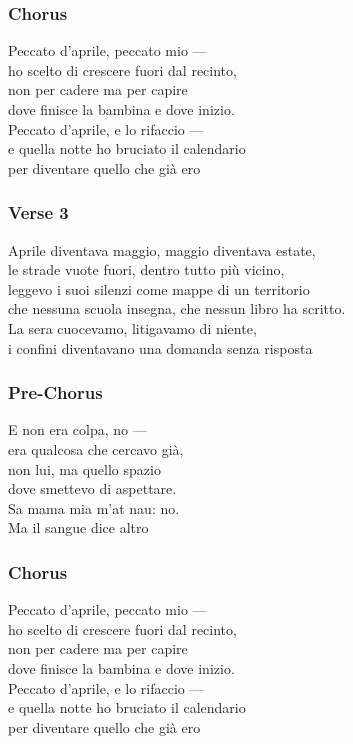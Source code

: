 \subsubsection{Chorus}\label{chorus-17}

Peccato d'aprile, peccato mio ---\\
ho scelto di crescere fuori dal recinto,\\
non per cadere ma per capire\\
dove finisce la bambina e dove inizio.\\
Peccato d'aprile, e lo rifaccio ---\\
e quella notte ho bruciato il calendario\\
per diventare quello che già ero

\subsubsection{Verse 3}\label{verse-3-2}

Aprile diventava maggio, maggio diventava estate,\\
le strade vuote fuori, dentro tutto più vicino,\\
leggevo i suoi silenzi come mappe di un territorio\\
che nessuna scuola insegna, che nessun libro ha scritto.\\
La sera cuocevamo, litigavamo di niente,\\
i confini diventavano una domanda senza risposta

\subsubsection{Pre-Chorus}\label{pre-chorus-9}

E non era colpa, no ---\\
era qualcosa che cercavo già,\\
non lui, ma quello spazio\\
dove smettevo di aspettare.\\
Sa mama mia m'at nau: no.\\
Ma il sangue dice altro

\subsubsection{Chorus}\label{chorus-18}

Peccato d'aprile, peccato mio ---\\
ho scelto di crescere fuori dal recinto,\\
non per cadere ma per capire\\
dove finisce la bambina e dove inizio.\\
Peccato d'aprile, e lo rifaccio ---\\
e quella notte ho bruciato il calendario\\
per diventare quello che già ero

